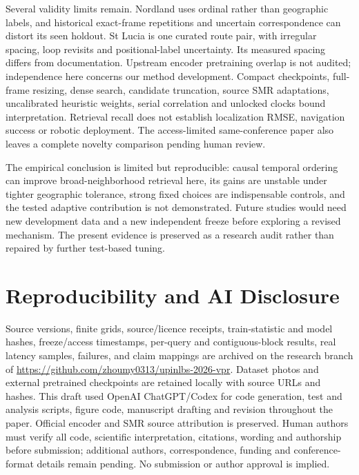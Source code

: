 \documentclass[conference]{IEEEtran}
\begin{document}
Several validity limits remain. Nordland uses ordinal rather than geographic labels, and historical exact-frame repetitions and uncertain correspondence can distort its seen holdout. St Lucia is one curated route pair, with irregular spacing, loop revisits and positional-label uncertainty. Its measured spacing differs from documentation. Upstream encoder pretraining overlap is not audited; independence here concerns our method development. Compact checkpoints, full-frame resizing, dense search, candidate truncation, source SMR adaptations, uncalibrated heuristic weights, serial correlation and unlocked clocks bound interpretation. Retrieval recall does not establish localization RMSE, navigation success or robotic deployment. The access-limited same-conference paper also leaves a complete novelty comparison pending human review.

The empirical conclusion is limited but reproducible: causal temporal ordering can improve broad-neighborhood retrieval here, its gains are unstable under tighter geographic tolerance, strong fixed choices are indispensable controls, and the tested adaptive contribution is not demonstrated. Future studies would need new development data and a new independent freeze before exploring a revised mechanism. The present evidence is preserved as a research audit rather than repaired by further test-based tuning.

\section*{Reproducibility and AI Disclosure}
Source versions, finite grids, source/licence receipts, train-statistic and model hashes, freeze/access timestamps, per-query and contiguous-block results, real latency samples, failures, and claim mappings are archived on the research branch of \url{https://github.com/zhoumy0313/upinlbs-2026-vpr}. Dataset photos and external pretrained checkpoints are retained locally with source URLs and hashes. This draft used OpenAI ChatGPT/Codex for code generation, test and analysis scripts, figure code, manuscript drafting and revision throughout the paper. Official encoder and SMR source attribution is preserved. Human authors must verify all code, scientific interpretation, citations, wording and authorship before submission; additional authors, correspondence, funding and conference-format details remain pending. No submission or author approval is implied.
\end{document}
